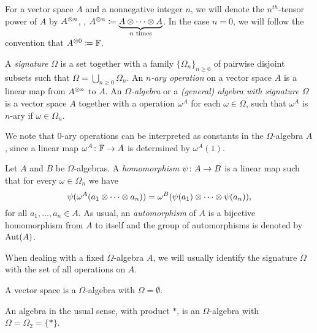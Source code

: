 \begin{notation}
    For a vector space $A$ and a nonnegative integer $n$, we will denote the $n^{th}$-tensor power of $A$ by $A^{\otimes n}$, \ie,
    $A^{\otimes n} \coloneqq \underbrace{A\otimes\cdots\otimes A}_{n \text{ times}}$. 
    In the case $n = 0$, we will follow the convention that $A^{\otimes 0} \coloneqq \mathbb{F}$.
\end{notation}

\begin{defi}\label{def:universal-algebra}
    A \emph{signature} $\Omega$ is a set together with a family $\{ \Omega_n \}_{n \geq 0}$ of pairwise disjoint subsets such that $\Omega = \bigcup_{n \geq 0} \Omega_n$. 
    An \emph{$n$-ary operation} on a vector space $A$ is a linear map from $A^{\otimes n}$ to $A$. 
    An \emph{$\Omega$-algebra} or a \emph{(general) algebra with signature $\Omega$} is a vector space $A$ together with a operation $\omega^A$ for each $\omega \in \Omega$, such that $\omega^A$ is $n$-ary if $\omega \in \Omega_n$.
\end{defi}

We note that $0$-ary operations can be interpreted as constants in the $\Omega$-algebra $A$, since a linear map $\omega^A\colon \mathbb{F} \to A$ is determined by $\omega^A(1)$.

\begin{defi}
    Let $A$ and $B$ be $\Omega$-algebras. 
    A \emph{homomorphism} $\psi\colon A \to B$ is a linear map such that for every $\omega \in \Omega_n$ we have
    \[
        \psi( \omega^A (a_1 \otimes \cdots \otimes a_n) ) = \omega^B ( \psi(a_1) \otimes \cdots \otimes \psi(a_n) ),
    \]
    for all $a_1, \ldots, a_n \in A$. 
    As usual, an \emph{automorphism} of $A$ is a bijective homomorphism from $A$ to itself and the group of automorphisms is denoted by $\operatorname{Aut}(A)$.
\end{defi}

When dealing with a fixed $\Omega$-algebra $A$, we will usually identify the signature $\Omega$ with the set of all operations on $A$.

\begin{ex}\label{ex:omega-vec-space}
    A vector space is a $\Omega$-algebra with $\Omega = \emptyset$.
\end{ex}

\begin{ex}\label{ex:omega-algebra}
    An algebra in the usual sense, with product $*$, is an $\Omega$-algebra with $\Omega = \Omega_2 = \{ * \}$. 
\end{ex}

